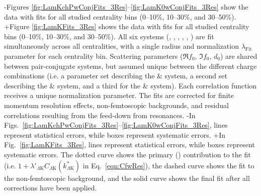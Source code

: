 -Figures \ref{fig:LamKchPwConjFits_3Res}--\ref{fig:LamK0wConjFits_3Res} show the \LamK data with fits for all studied centrality bins (0--10\%, 10--30\%, and 30--50\%). 
+Figure \ref{fig:LamKFits_3Res} shows the \LamK data with fits for all studied centrality bins (0--10\%, 10--30\%, and 30--50\%). 
 All six \LamK systems (\LamKchP, \ALamKchM, \LamKchM, \ALamKchP, \LamKs, \ALamKs) are fit simultaneously across all centralities, with a single radius and normalization $\lambda_{\mathrm{Fit}}$ parameter for each centrality bin.
 Scattering parameters ($\Re f_{0}$, $\Im f_{0}$, $d_{0}$) are shared between pair-conjugate systems, but assumed unique between the different \LamK charge combinations (i.e. a parameter set describing the \LamKchP \& \ALamKchM system, a second set describing the \LamKchM \& \ALamKchP system, and a third for the \LamKs \& \ALamKs system).
 Each correlation function receives a unique normalization parameter.
 The fits are corrected for finite momentum resolution effects, non-femtoscopic backgrounds, and residual correlations resulting from the feed-down from resonances.
-In Figs.\ \ref{fig:LamKchPwConjFits_3Res}--\ref{fig:LamK0wConjFits_3Res}, lines represent statistical errors, while boxes represent systematic errors.  
+In Fig.\ \ref{fig:LamKFits_3Res}, lines represent statistical errors, while boxes represent systematic errors.  
 The dotted curve shows the primary (\LamK) contribution to the fit (i.e. $1 + \lambda'_{\Lambda\mathrm{K}}C_{\Lambda\mathrm{K}}(k^{*}_{\Lambda\mathrm{K}})$ in Eq.\ \ref{eqn:CfwRes}), the dashed curve shows the fit to the non-femtoscopic background, and the solid curve shows the final fit after all corrections have been applied.
 
